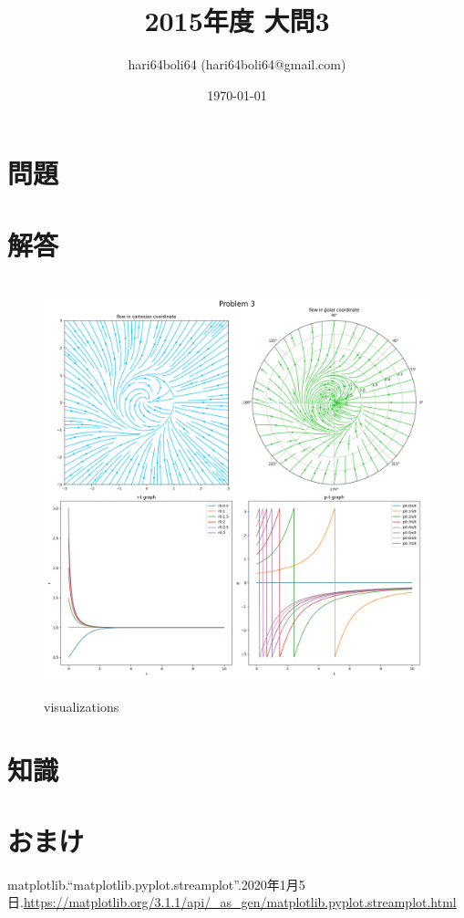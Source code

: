 \documentclass[a4paper, 10pt, dvipdfmx]{jlreq}
\begin{document}
\title{2015年度 大問3}
\author{hari64boli64 (hari64boli64@gmail.com)}
\date{\today}
\maketitle

\section{問題}

\section{解答}


\begin{figure}[htbp]
  \begin{center}
    \includegraphics[height=120mm]{3.png}
    \caption{visualizations}
    \label{img:vis}
  \end{center}
\end{figure}

\section{知識}

\section{おまけ}



\begin{thebibliography}{9}
  matplotlib.“matplotlib.pyplot.streamplot”.2020年1月5日.\url{https://matplotlib.org/3.1.1/api/_as_gen/matplotlib.pyplot.streamplot.html}
\end{thebibliography}
\end{document}
